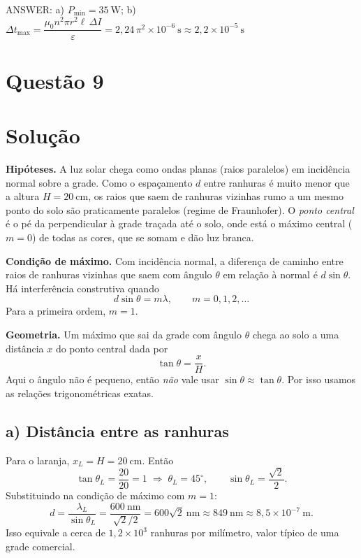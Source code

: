 \documentclass{article}%
\begin{document}
ANSWER: a) $P_{\min}=35\ \text{W}$; \quad b) $\Delta t_{\max}=\dfrac{\mu_0 n^2\pi r^2\ell\,\Delta I}{\varepsilon}=2{,}24\,\pi^2\times10^{-6}\ \text{s}\approx 2{,}2\times10^{-5}\ \text{s}$%
\newpage%
\section*{Questão 9}

\section*{Solução}

\textbf{Hipóteses.} A luz solar chega como ondas planas (raios paralelos) em incidência normal sobre a grade. Como o espaçamento $d$ entre ranhuras é muito menor que a altura $H = 20\ \text{cm}$, os raios que saem de ranhuras vizinhas rumo a um mesmo ponto do solo são praticamente paralelos (regime de Fraunhofer). O \emph{ponto central} é o pé da perpendicular à grade traçada até o solo, onde está o máximo central ($m=0$) de todas as cores, que se somam e dão luz branca.

\textbf{Condição de máximo.} Com incidência normal, a diferença de caminho entre raios de ranhuras vizinhas que saem com ângulo $\theta$ em relação à normal é $d\sin\theta$. Há interferência construtiva quando
\[
d\sin\theta = m\lambda, \qquad m = 0, 1, 2, \dots
\]
Para a primeira ordem, $m = 1$.

\textbf{Geometria.} Um máximo que sai da grade com ângulo $\theta$ chega ao solo a uma distância $x$ do ponto central dada por
\[
\tan\theta = \frac{x}{H}.
\]
Aqui o ângulo não é pequeno, então \emph{não} vale usar $\sin\theta \approx \tan\theta$. Por isso usamos as relações trigonométricas exatas.

\subsection*{a) Distância entre as ranhuras}

Para o laranja, $x_L = H = 20\ \text{cm}$. Então
\[
\tan\theta_L = \frac{20}{20} = 1 \;\Rightarrow\; \theta_L = 45^\circ, \qquad \sin\theta_L = \frac{\sqrt{2}}{2}.
\]
Substituindo na condição de máximo com $m=1$:
\[
d = \frac{\lambda_L}{\sin\theta_L} = \frac{600\ \text{nm}}{\sqrt{2}/2} = 600\sqrt{2}\ \text{nm} \approx 849\ \text{nm} \approx 8{,}5\times 10^{-7}\ \text{m}.
\]
Isso equivale a cerca de $1{,}2\times 10^{3}$ ranhuras por milímetro, valor típico de uma grade comercial.
\end{document}
